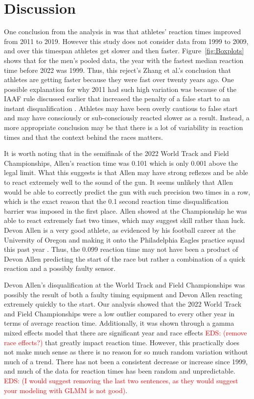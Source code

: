 \documentclass[12pt, letterpaper, titlepage]{article}
\newcommand{\eds}[1]{\textcolor{red}{EDS: (#1)}}
\begin{document}
\section{Discussion}\label{sec:Discussion}

One conclusion from the analysis in \citet{zhang2021correlation} was that 
athletes'
reaction times improved from 2011 to 2019.  However this study does not consider 
data from 1999 to 2009, and over this timespan athletes get slower and then
faster.  Figure~\ref{fig:Boxplots} shows that for the men's pooled data, the 
year with the fastest median reaction time before 2022 was 1999.  Thus, this 
reject's Zhang et al.'s conclusion that athletes are getting faster because they 
were 
fast over twenty years ago. One possible explanation for why 2011 had such
high variation was because of the IAAF rule discussed earlier that increased the
penalty of a false start to an instant disqualification \citep{iaaf2009falsestart}.
Athletes may have been overly cautious to false start and may have consciously
or sub-consciously reacted slower as a result.  Instead, a more appropriate 
conclusion may be that there is a lot of variability in reaction times and that
the context behind the races matters.

It is worth noting that in the semifinals of the 2022 World Track and
Field Championships, Allen's reaction time was 0.101 which is only 0.001 above
the legal limit. What this suggests is that Allen may have strong reflexes
and be able to react extremely well to the sound of the gun. It seems unlikely 
that Allen would be able to correctly predict the gun with such precision two 
times in a row, which is the exact reason that the 0.1 second reaction time 
disqualification barrier was
imposed in the first place. Allen showed at the Championship he was able to
react extremely fast two times, which may suggest skill rather than luck. Devon 
Allen is a very good athlete, as evidenced by his football career at the 
University of Oregon
and making it onto the Philadelphia Eagles practice squad this past year 
\citep{hurley2022eagles}. Thus, the 0.099 reaction time may not have been 
a product of Devon Allen predicting the start of the race but rather a 
combination of a quick reaction and a possibly faulty sensor.

Devon Allen's disqualification at the World Track and Field Championships was
possibly the result of both a faulty timing equipment and Devon Allen
reacting extremely quickly to the start.  Our analysis showed that
the 2022 World Track and Field Championships were a low outlier compared to
every other year in terms of average reaction time.  Additionally, it was shown
through a gamma mixed effects model that there are significant year and race
effects \eds{remove race effects?} that greatly impact reaction time.  
However, this practically does not make much sense
as there is no reason for so much random variation without much of a trend.
There has not been a consistent decrease or increase since 1999, and much of the 
data
for reaction times has been random and unpredictable. 
\eds{I would suggest removing the last two sentences, as they would suggest your
 modeling with GLMM is not good}.  
\end{document}
